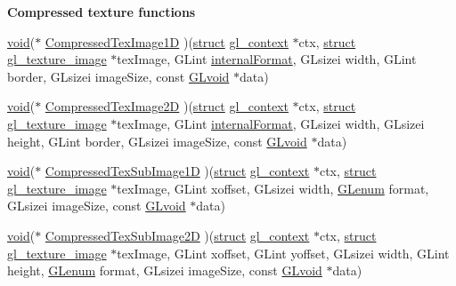 \begin{Indent}\textbf{ Compressed texture functions}\par
\begin{DoxyCompactItemize}
\item 
\hyperlink{interfacevoid}{void}($\ast$ \hyperlink{structdd__function__table_a3c38c3f19f2f4702cd4f239bbc29f012}{Compressed\+Tex\+Image1D} )(\hyperlink{interfacestruct}{struct} \hyperlink{structgl__context}{gl\+\_\+context} $\ast$ctx, \hyperlink{interfacestruct}{struct} \hyperlink{structgl__texture__image}{gl\+\_\+texture\+\_\+image} $\ast$tex\+Image, G\+Lint \hyperlink{interfacevoid}{internal\+Format}, G\+Lsizei width, G\+Lint border, G\+Lsizei image\+Size, const \hyperlink{interfacevoid}{G\+Lvoid} $\ast$data)
\item 
\hyperlink{interfacevoid}{void}($\ast$ \hyperlink{structdd__function__table_ae8789f6fbfc35d057639ed8adbd58db2}{Compressed\+Tex\+Image2D} )(\hyperlink{interfacestruct}{struct} \hyperlink{structgl__context}{gl\+\_\+context} $\ast$ctx, \hyperlink{interfacestruct}{struct} \hyperlink{structgl__texture__image}{gl\+\_\+texture\+\_\+image} $\ast$tex\+Image, G\+Lint \hyperlink{interfacevoid}{internal\+Format}, G\+Lsizei width, G\+Lsizei height, G\+Lint border, G\+Lsizei image\+Size, const \hyperlink{interfacevoid}{G\+Lvoid} $\ast$data)
\item 
\hyperlink{interfacevoid}{void}($\ast$ \hyperlink{structdd__function__table_a374e6d241342f182142b6a9d19e2f9ac}{Compressed\+Tex\+Sub\+Image1D} )(\hyperlink{interfacestruct}{struct} \hyperlink{structgl__context}{gl\+\_\+context} $\ast$ctx, \hyperlink{interfacestruct}{struct} \hyperlink{structgl__texture__image}{gl\+\_\+texture\+\_\+image} $\ast$tex\+Image, G\+Lint xoffset, G\+Lsizei width, \hyperlink{interfacevoid}{G\+Lenum} format, G\+Lsizei image\+Size, const \hyperlink{interfacevoid}{G\+Lvoid} $\ast$data)
\item 
\hyperlink{interfacevoid}{void}($\ast$ \hyperlink{structdd__function__table_a3f6e668531dd8aab592942e3ec6b3ce3}{Compressed\+Tex\+Sub\+Image2D} )(\hyperlink{interfacestruct}{struct} \hyperlink{structgl__context}{gl\+\_\+context} $\ast$ctx, \hyperlink{interfacestruct}{struct} \hyperlink{structgl__texture__image}{gl\+\_\+texture\+\_\+image} $\ast$tex\+Image, G\+Lint xoffset, G\+Lint yoffset, G\+Lsizei width, G\+Lint height, \hyperlink{interfacevoid}{G\+Lenum} format, G\+Lsizei image\+Size, const \hyperlink{interfacevoid}{G\+Lvoid} $\ast$data)
\end{DoxyCompactItemize}
\end{Indent}
